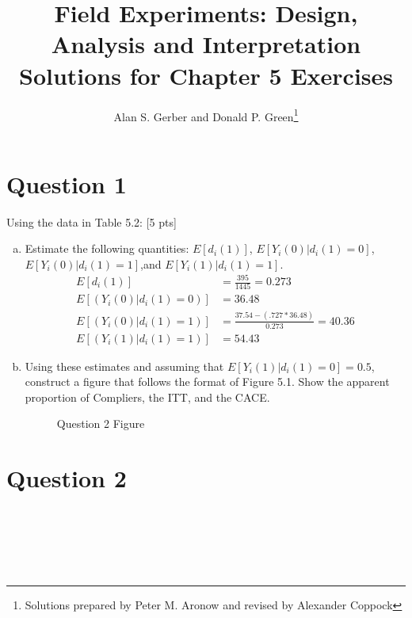 \documentclass[11pt,notitlepage]{article}\usepackage[]{graphicx}\usepackage[]{color}
\title{Field Experiments: Design, Analysis and Interpretation \\
Solutions for Chapter 5 Exercises}
\author{Alan S. Gerber and Donald P. Green\footnote{Solutions prepared by Peter M. Aronow and revised by Alexander Coppock}}
\date{\vspace{-5ex}}
\makeatletter
\newenvironment{kframe}{%
 \def\at@end@of@kframe{}%
 \ifinner\ifhmode%
  \def\at@end@of@kframe{\end{minipage}}%
  \begin{minipage}{\columnwidth}%
 \fi\fi%
 \def\FrameCommand##1{\hskip\@totalleftmargin \hskip-\fboxsep
 \colorbox{shadecolor}{##1}\hskip-\fboxsep
     \hskip-\linewidth \hskip-\@totalleftmargin \hskip\columnwidth}%
 \MakeFramed {\advance\hsize-\width
   \@totalleftmargin\z@ \linewidth\hsize
   \@setminipage}}%
 {\par\unskip\endMakeFramed%
 \at@end@of@kframe}
\newenvironment{knitrout}{}{} %
\makeatother
\begin{document}
\maketitle

\section*{Question 1}
Using the data in Table 5.2: [5 pts]
\begin{enumerate}[a)]
\item Estimate the following quantities: $E[d_i(1)]$, $E[Y_i(0)|d_i(1) = 0]$, $E[Y_i(0)| d_i(1) = 1]$,and $E[Y_i(1)|d_i(1)=1]$.\\
\begin{align*}
E[d_i(1)] &= \frac{395}{1445} = 0.273\\
E[(Y_i(0)|d_i(1) = 0)] &= 36.48\\
E[(Y_i(0)|d_i(1) = 1)] &= \frac{37.54 - (.727*36.48)}{0.273} = 40.36\\
E[(Y_i(1)|d_i(1) = 1)] &= 54.43
\end{align*}

\item Using these estimates and assuming that $E[Y_i(1)|d_i(1) = 0] = 0.5$, construct a figure that follows the format of Figure 5.1. Show the apparent proportion of Compliers, the ITT, and the CACE.

\begin{figure}[H]
    \centering
        \caption{Question 2 Figure}
    \qquad
\end{figure}

\end{enumerate}


\section*{Question 2}
\begin{knitrout}
\color{fgcolor}\begin{kframe}
\begin{verbatim}






\end{verbatim}
\end{kframe}
\end{knitrout}
\end{document}
